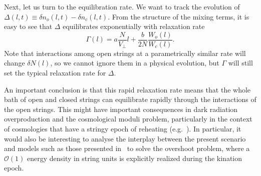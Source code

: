 \documentclass[a4paper,11pt]{article}
\begin{document}
{{{{{{{{{{{{Next, let us turn to  the equilibration rate. We want to track the evolution of
 $\Delta(l,t) \equiv \delta n_o(l,t)-\delta n_c(l,t)$. 
From the structure of the mixing terms, it is easy to see that
$\Delta$ equilibrates exponentially with relaxation rate \begin{equation}
\Gamma(l) =a\frac{N}{V_\perp}l+\frac{b}{2N}\frac{W_o(l)}{W_c (l)} .
\end{equation}
Note that interactions among open strings at
a parametrically similar rate will change $\delta N(l)$, so we cannot ignore them in a physical evolution, but  $\Gamma$ will 
still set the typical relaxation rate for $\Delta$. 

An important conclusion is that this rapid relaxation rate means that the 
whole bath of open and closed strings can equilibrate rapidly through the
interactions of the open strings.
This might have important consequences in dark radiation overproduction and the cosmological moduli problem, particularly in the context of cosmologies that have a stringy epoch of reheating
(e.g.~\cite{Frey:2005jk,Frey:2021jyo}). In particular, it would also be interesting to analyse the interplay between the present scenario and models such as those presented in~\cite{Apers:2022cyl,Conlon:2022pnx} to solve the overshoot problem, where a $\mathcal{O}(1)$ energy density in string units is explicitly realized during the kination epoch.

}}}}}}}}}}}}
\end{document}
